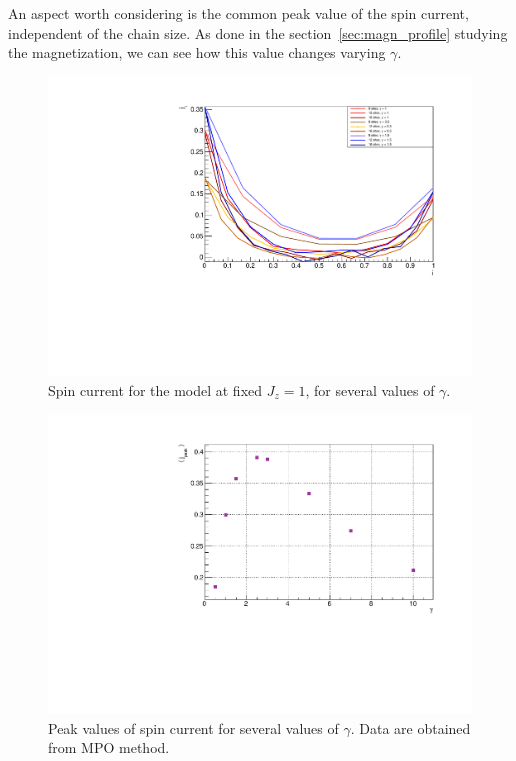 An aspect worth considering is the common peak value of the spin current, independent of the chain size. As done in the section~\ref{sec:magn_profile} studying the magnetization, we can see how this value changes varying $\gamma$. 

\begin{figure}[H]
    \centering
    \includegraphics[scale=0.7]{Figures/SpinCurrcomparisonVSsizeANDdissipationRate.pdf}
    \caption{Spin current for the model at fixed $J_z = 1$, for several values of $\gamma$.}
    \label{fig:SpinCurrcomparisonVSsizeANDdissipationRate}
\end{figure}

\begin{figure}[H]
    \centering
    \includegraphics[scale=0.7]{Figures/PeakValueSpinCurrVSgamma_8sites.pdf}
    \caption{Peak values of spin current for several values of $\gamma$. Data are obtained from MPO method.}
    \label{fig:PeakValueSpinCurrVSgamma_8sites}
\end{figure}

